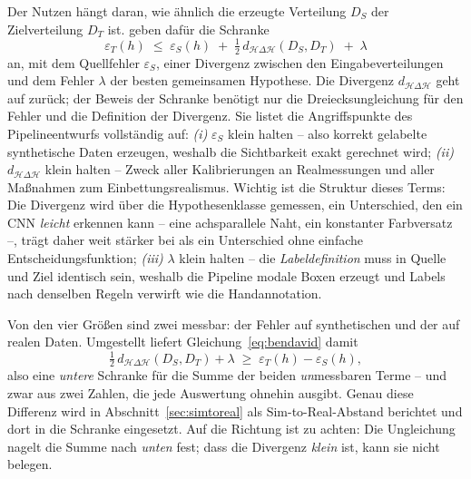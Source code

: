  Der Nutzen hängt daran,
wie ähnlich die erzeugte Verteilung $D_S$ der Zielverteilung $D_T$ ist.
\textcite[Theorem~2]{bendavid2010} geben dafür die Schranke
\begin{equation}
\varepsilon_T(h) \;\leq\; \varepsilon_S(h)
\;+\; \tfrac{1}{2}\,d_{\mathcal{H}\Delta\mathcal{H}}(D_S, D_T) \;+\; \lambda
\label{eq:bendavid}
\end{equation}
an, mit dem Quellfehler $\varepsilon_S$, einer Divergenz zwischen den
Eingabeverteilungen und dem Fehler $\lambda$ der besten gemeinsamen Hypothese.
Die Divergenz $d_{\mathcal{H}\Delta\mathcal{H}}$ geht auf
\textcite{bendavid2007} zurück; der Beweis der Schranke benötigt nur die
Dreiecksungleichung für den Fehler und die Definition der Divergenz.
Sie listet die Angriffspunkte des Pipelineentwurfs vollständig auf:
\emph{(i)} $\varepsilon_S$ klein halten -- also korrekt gelabelte synthetische
Daten erzeugen, weshalb die Sichtbarkeit exakt gerechnet wird;
\emph{(ii)} $d_{\mathcal{H}\Delta\mathcal{H}}$ klein halten -- Zweck aller
Kalibrierungen an Realmessungen und aller Maßnahmen zum Einbettungsrealismus.
Wichtig ist die Struktur dieses Terms: Die Divergenz wird über die
Hypothesenklasse gemessen, ein Unterschied, den ein CNN \emph{leicht} erkennen
kann -- eine achsparallele Naht, ein konstanter Farbversatz --, trägt daher weit
stärker bei als ein Unterschied ohne einfache Entscheidungsfunktion;
\emph{(iii)} $\lambda$ klein halten -- die \emph{Labeldefinition} muss in Quelle
und Ziel identisch sein, weshalb die Pipeline modale Boxen erzeugt und Labels
nach denselben Regeln verwirft wie die Handannotation.

 Von den vier Größen sind zwei
messbar: der Fehler auf synthetischen und der auf realen Daten. Umgestellt liefert
Gleichung~\eqref{eq:bendavid} damit
\begin{equation}
\tfrac{1}{2}\,d_{\mathcal{H}\Delta\mathcal{H}}(D_S, D_T) + \lambda \;\geq\;
\varepsilon_T(h) - \varepsilon_S(h),
\label{eq:bendavid-diff}
\end{equation}
also eine \emph{untere} Schranke für die Summe der beiden \emph{un}messbaren
Terme -- und zwar aus zwei Zahlen, die jede Auswertung ohnehin ausgibt. Genau
diese Differenz wird in Abschnitt~\ref{sec:simtoreal} als Sim-to-Real-Abstand
berichtet und dort in die Schranke eingesetzt. Auf die Richtung ist zu achten:
Die Ungleichung nagelt die Summe nach \emph{unten} fest; dass die Divergenz
\emph{klein} ist, kann sie nicht belegen.

